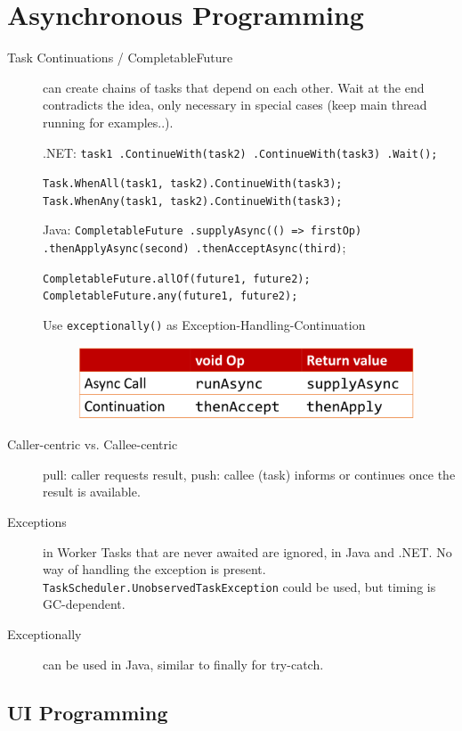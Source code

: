 \section{Asynchronous Programming}

\begin{description}
  \item[Task Continuations / CompletableFuture] can create chains of tasks that depend on each other. Wait at the end contradicts the idea, only necessary in special cases (keep main thread running for examples..).
  
  .NET: \texttt{task1
  .ContinueWith(task2)
  .ContinueWith(task3)
  .Wait();} 

  \texttt{Task.WhenAll(task1, task2).ContinueWith(task3);
  Task.WhenAny(task1, task2).ContinueWith(task3);}
  
  Java: \texttt{CompletableFuture
  .supplyAsync(() => firstOp)
  .thenApplyAsync(second)
  .thenAcceptAsync(third)};

  \texttt{CompletableFuture.allOf(future1, future2);
  CompletableFuture.any(future1, future2);}

  Use \texttt{exceptionally()} as Exception-Handling-Continuation
  \begin{figure}[H]
      \centering
      \includegraphics[width=10cm]{res/completable-future.png}
  \end{figure}
  
  \item[Caller-centric vs. Callee-centric] pull: caller requests result, push: callee (task) informs or continues once the result is available.
  
  \item[Exceptions] in Worker Tasks that are never awaited are ignored, in Java and .NET. No way of handling the exception is present. \texttt{TaskScheduler.UnobservedTaskException} could be used, but timing is GC-dependent.
  
  \item[Exceptionally] can be used in Java, similar to finally for try-catch.
\end{description}


\subsection{UI Programming}

